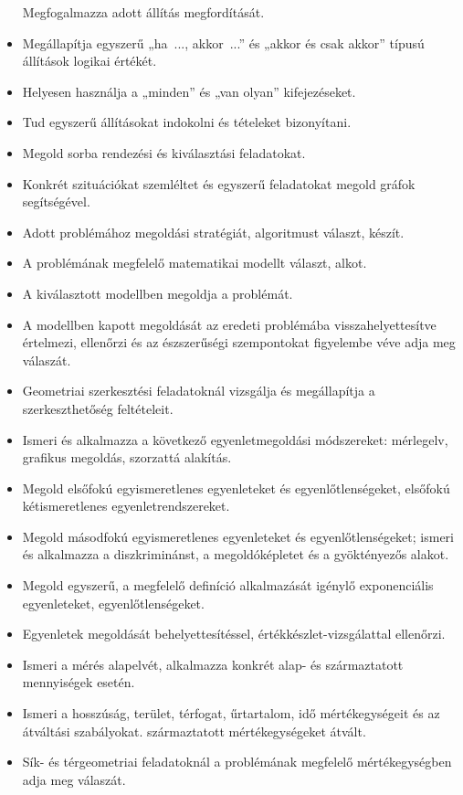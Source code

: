 \begin{itemize}
  Megfogalmazza adott állítás megfordítását.
\item
  Megállapítja egyszerű „ha~..., akkor~...'' és „akkor és csak akkor''
  típusú állítások logikai értékét.
\item
  Helyesen használja a „minden'' és „van olyan'' kifejezéseket.
\item
  Tud egyszerű állításokat indokolni és tételeket bizonyítani.
\item
  Megold sorba rendezési és kiválasztási feladatokat.
\item
  Konkrét szituációkat szemléltet és egyszerű feladatokat megold gráfok
  segítségével.
\item
  Adott problémához megoldási stratégiát, algoritmust választ, készít.
\item
  A problémának megfelelő matematikai modellt választ, alkot.
\item
  A kiválasztott modellben megoldja a problémát.
\item
  A modellben kapott megoldását az eredeti problémába
  visszahelyettesítve értelmezi, ellenőrzi és az észszerűségi
  szempontokat figyelembe véve adja meg válaszát.
\item
  Geometriai szerkesztési feladatoknál vizsgálja és megállapítja a
  szerkeszthetőség feltételeit.
\item
  Ismeri és alkalmazza a következő egyenletmegoldási módszereket:
  mérlegelv, grafikus megoldás, szorzattá alakítás.
\item
  Megold elsőfokú egyismeretlenes egyenleteket és egyenlőtlenségeket,
  elsőfokú kétismeretlenes egyenletrendszereket.
\item
  Megold másodfokú egyismeretlenes egyenleteket és egyenlőtlenségeket;
  ismeri és alkalmazza a diszkriminánst, a megoldóképletet és a
  gyöktényezős alakot.
\item
  Megold egyszerű, a megfelelő definíció alkalmazását igénylő
  exponenciális egyenleteket, egyenlőtlenségeket.
\item
  Egyenletek megoldását behelyettesítéssel, értékkészlet-vizsgálattal
  ellenőrzi.
\item
  Ismeri a mérés alapelvét, alkalmazza konkrét alap- és származtatott
  mennyiségek esetén.
\item
  Ismeri a hosszúság, terület, térfogat, űrtartalom, idő mértékegységeit
  és az átváltási szabályokat. származtatott mértékegységeket átvált.
\item
  Sík- és térgeometriai feladatoknál a problémának megfelelő
  mértékegységben adja meg válaszát.

\end{itemize}
